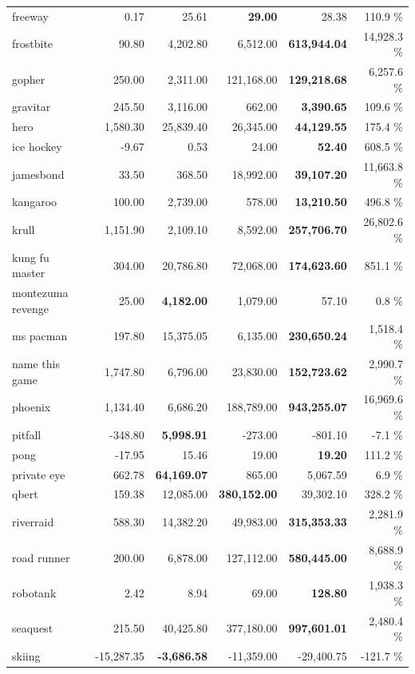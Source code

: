 \begin{center}
\begin{tabularx}{0.750000\textwidth}{X| r r r r r}
freeway &0.17 & 25.61 & \textbf{29.00} & 28.38 & 110.9 \%\\
frostbite &90.80 & 4,202.80 & 6,512.00 & \textbf{613,944.04} & 14,928.3 \%\\
gopher &250.00 & 2,311.00 & 121,168.00 & \textbf{129,218.68} & 6,257.6 \%\\
gravitar &245.50 & 3,116.00 & 662.00 & \textbf{3,390.65} & 109.6 \%\\
hero &1,580.30 & 25,839.40 & 26,345.00 & \textbf{44,129.55} & 175.4 \%\\
ice hockey &-9.67 & 0.53 & 24.00 & \textbf{52.40} & 608.5 \%\\
jamesbond &33.50 & 368.50 & 18,992.00 & \textbf{39,107.20} & 11,663.8 \%\\
kangaroo &100.00 & 2,739.00 & 578.00 & \textbf{13,210.50} & 496.8 \%\\
krull &1,151.90 & 2,109.10 & 8,592.00 & \textbf{257,706.70} & 26,802.6 \%\\
kung fu master &304.00 & 20,786.80 & 72,068.00 & \textbf{174,623.60} & 851.1 \%\\
montezuma revenge &25.00 & \textbf{4,182.00} & 1,079.00 & 57.10 & 0.8 \%\\
ms pacman &197.80 & 15,375.05 & 6,135.00 & \textbf{230,650.24} & 1,518.4 \%\\
name this game &1,747.80 & 6,796.00 & 23,830.00 & \textbf{152,723.62} & 2,990.7 \%\\
phoenix &1,134.40 & 6,686.20 & 188,789.00 & \textbf{943,255.07} & 16,969.6 \%\\
pitfall &-348.80 & \textbf{5,998.91} & -273.00 & -801.10 & -7.1 \%\\
pong &-17.95 & 15.46 & 19.00 & \textbf{19.20} & 111.2 \%\\
private eye &662.78 & \textbf{64,169.07} & 865.00 & 5,067.59 & 6.9 \%\\
qbert &159.38 & 12,085.00 & \textbf{380,152.00} & 39,302.10 & 328.2 \%\\
riverraid &588.30 & 14,382.20 & 49,983.00 & \textbf{315,353.33} & 2,281.9 \%\\
road runner &200.00 & 6,878.00 & 127,112.00 & \textbf{580,445.00} & 8,688.9 \%\\
robotank &2.42 & 8.94 & 69.00 & \textbf{128.80} & 1,938.3 \%\\
seaquest &215.50 & 40,425.80 & 377,180.00 & \textbf{997,601.01} & 2,480.4 \%\\
skiing &-15,287.35 & \textbf{-3,686.58} & -11,359.00 & -29,400.75 & -121.7 \%\\

\end{tabularx}
\end{center}
